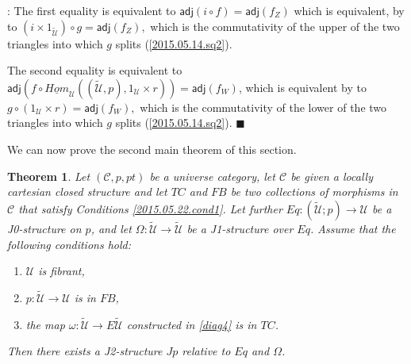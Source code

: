 \documentclass[12pt]{article}
\numberwithin{equation}{section}
\newenvironment{myproof}{{\bf Proof}:}{$\blacksquare$ \vskip 5mm }
\newtheorem{theorem}[proposition]{Theorem}
\newcommand{\sr}{\rightarrow}
\newcommand{\uu}{\underline}
\newcommand{\iHom}{\uu{Hom}}
\newcommand{\wt}{\widetilde}
\newcommand{\C}{{\mathcal C}}  %
\newcommand{\id}{1}            %
\newcommand{\U}{\mathcal{U}}
\newcommand{\adj}{\mathsf{adj}}
\begin{document}
\begin{myproof}
The first equality is equivalent to $\adj(i\circ f)=\adj(f_Z)$ which is
equivalent, by \cite[Lemma 8.7(3)]{fromunivwithPi} to
$(i\times \id_{\wt{\U}})\circ g=\adj(f_Z),$
which is the commutativity of the upper of the
two triangles into which $g$ splits (\ref{2015.05.14.sq2}).

The second equality is equivalent to
$\adj(f\circ \iHom_\U((\wt{\U},p), \id_\U\times r))=\adj(f_W)$,
which is equivalent by \cite[Lemma 8.7(1)]{fromunivwithPi} to
$g\circ (\id_\U\times r)=\adj(f_W),$ which is the
commutativity of the lower of the two triangles into which $g$ splits
(\ref{2015.05.14.sq2}).
\end{myproof}
%

We can now prove the second main theorem of this section.
%
\begin{theorem}
\label{2015.05.16.th1} Let $({\C},p,pt)$ be a universe category, let
$\C$ be given a locally cartesian closed structure and let $TC$ and
$FB$ be two collections of morphisms in $\C$ that satisfy Conditions
\ref{2015.05.22.cond1}. Let further $Eq:(\wt{\U};p)\sr \U$ be a J0-structure on $p$,
and let $\Omega:\wt{\U}\sr \wt{\U}$ be a J1-structure over $Eq$.
Assume that the following conditions hold:
%
\begin{enumerate}
\item $\U$ is fibrant,
\item $p:\wt{\U}\sr \U$ is in $FB$,
\item the map $\omega : \wt{\U}\sr E\wt{\U}$ constructed in \ref{diag4} is in $TC$.
\end{enumerate}
%
Then there exists a J2-structure $Jp$ relative to $Eq$ and $\Omega$.
\end{theorem}
%
\end{document}
